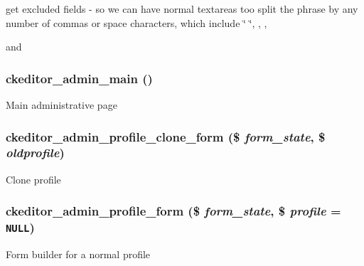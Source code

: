 get excluded fields - so we can have normal textareas too split the phrase by any number of commas or space characters, which include \char`\"{} \char`\"{}, , , \par
 and \hypertarget{ckeditor_8admin_8inc_68d8d3c0cc2912cbcb346d61da5b4447}{
\subsubsection[{ckeditor\_\-admin\_\-main}]{\setlength{\rightskip}{0pt plus 5cm}ckeditor\_\-admin\_\-main ()}}
\label{ckeditor_8admin_8inc_68d8d3c0cc2912cbcb346d61da5b4447}


Main administrative page \hypertarget{ckeditor_8admin_8inc_30a1df72aabcda54c300c0a046c89b88}{
\subsubsection[{ckeditor\_\-admin\_\-profile\_\-clone\_\-form}]{\setlength{\rightskip}{0pt plus 5cm}ckeditor\_\-admin\_\-profile\_\-clone\_\-form (\$ {\em form\_\-state}, \/  \$ {\em oldprofile})}}
\label{ckeditor_8admin_8inc_30a1df72aabcda54c300c0a046c89b88}


Clone profile \hypertarget{ckeditor_8admin_8inc_4830c622a5240191b4ab1ac7ee60c90e}{
\subsubsection[{ckeditor\_\-admin\_\-profile\_\-form}]{\setlength{\rightskip}{0pt plus 5cm}ckeditor\_\-admin\_\-profile\_\-form (\$ {\em form\_\-state}, \/  \$ {\em profile} = {\tt NULL})}}
\label{ckeditor_8admin_8inc_4830c622a5240191b4ab1ac7ee60c90e}


Form builder for a normal profile 

